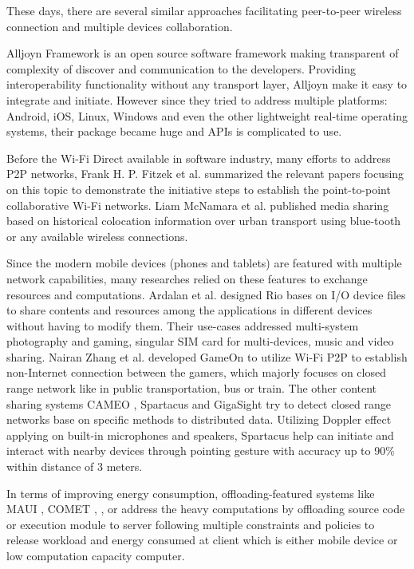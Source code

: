 \documentclass{sig-alternate}[10pt]
\begin{document}
These days, there are several similar approaches facilitating peer-to-peer wireless connection and multiple devices collaboration. 

Alljoyn Framework \cite{alljoyn} is an open source software framework making transparent of complexity of discover and communication to the developers. Providing interoperability functionality without any transport layer, Alljoyn make it easy to integrate and initiate. However since they tried to address multiple platforms: Android, iOS, Linux, Windows and even the other lightweight real-time operating systems, their package became huge and APIs is complicated to use. 

Before the Wi-Fi Direct available in software industry, many efforts to address P2P networks, Frank H. P. Fitzek et al. \cite{m_p2p_tutor} summarized the relevant papers focusing on this topic to demonstrate the initiative steps to establish the point-to-point collaborative Wi-Fi networks. Liam McNamara et al. published \cite{media_share} media sharing based on historical colocation information over urban transport using blue-tooth or any available wireless connections.

Since the modern mobile devices (phones and tablets) are featured with multiple network capabilities, many researches relied on these features to exchange resources and computations. Ardalan et al. designed Rio \cite{rio} bases on I/O device files to share contents and resources among the applications in different devices without having to modify them. Their use-cases addressed multi-system photography and gaming, singular SIM card for multi-devices, music and video sharing. Nairan Zhang et al. developed GameOn \cite{gameon} to utilize Wi-Fi P2P to establish non-Internet connection between the gamers, which majorly focuses on closed range network like in public transportation, bus or train. The other content sharing systems CAMEO \cite{cameo}, Spartacus \cite{spartacus} and GigaSight \cite{crowd-sourcing} try to detect closed range networks base on specific methods to distributed data. Utilizing Doppler effect applying on built-in microphones and speakers, Spartacus help can initiate and interact with nearby devices through pointing gesture with accuracy up to 90\% within distance of 3 meters.

In terms of improving energy consumption, offloading-featured systems like MAUI \cite{maui}, COMET \cite{comet}, \cite{kwon+:mobilesoft15}, \cite{mobile-cloud-middleware} or \cite{fuzzy-engine} address the heavy computations by offloading source code or execution module to server following multiple constraints and policies to release workload and energy consumed at client which is either mobile device or low computation capacity computer. 
\end{document}
